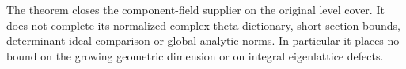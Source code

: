The theorem closes the component-field supplier on the original level
cover.  It does not complete its normalized complex theta dictionary,
short-section bounds, determinant-ideal comparison or global analytic
norms.  In particular it places no bound on the growing geometric
dimension or on integral eigenlattice defects.
